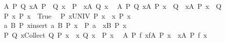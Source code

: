 \begin{isabellebody}
\ \ {\isachardoublequoteopen}{\isasymAnd}A\ P\ Q{\isachardot}{\kern0pt}\ {\isacharparenleft}{\kern0pt}{\isasymforall}x{\isasymin}A{\isachardot}{\kern0pt}\ P\ {\isasymlongrightarrow}\ Q\ x{\isacharparenright}{\kern0pt}\ {\isasymlongleftrightarrow}\ {\isacharparenleft}{\kern0pt}P\ {\isasymlongrightarrow}\ {\isacharparenleft}{\kern0pt}{\isasymforall}x{\isasymin}A{\isachardot}{\kern0pt}\ Q\ x{\isacharparenright}{\kern0pt}{\isacharparenright}{\kern0pt}{\isachardoublequoteclose}\isanewline
\ \ {\isachardoublequoteopen}{\isasymAnd}A\ P\ Q{\isachardot}{\kern0pt}\ {\isacharparenleft}{\kern0pt}{\isasymforall}x{\isasymin}A{\isachardot}{\kern0pt}\ P\ x\ {\isasymlongrightarrow}\ Q{\isacharparenright}{\kern0pt}\ {\isasymlongleftrightarrow}\ {\isacharparenleft}{\kern0pt}{\isacharparenleft}{\kern0pt}{\isasymexists}x{\isasymin}A{\isachardot}{\kern0pt}\ P\ x{\isacharparenright}{\kern0pt}\ {\isasymlongrightarrow}\ Q{\isacharparenright}{\kern0pt}{\isachardoublequoteclose}\isanewline
\ \ {\isachardoublequoteopen}{\isasymAnd}P{\isachardot}{\kern0pt}\ {\isacharparenleft}{\kern0pt}{\isasymforall}x{\isasymin}{\isacharbraceleft}{\kern0pt}{\isacharbraceright}{\kern0pt}{\isachardot}{\kern0pt}\ P\ x{\isacharparenright}{\kern0pt}\ {\isasymlongleftrightarrow}\ True{\isachardoublequoteclose}\isanewline
\ \ {\isachardoublequoteopen}{\isasymAnd}P{\isachardot}{\kern0pt}\ {\isacharparenleft}{\kern0pt}{\isasymforall}x{\isasymin}UNIV{\isachardot}{\kern0pt}\ P\ x{\isacharparenright}{\kern0pt}\ {\isasymlongleftrightarrow}\ {\isacharparenleft}{\kern0pt}{\isasymforall}x{\isachardot}{\kern0pt}\ P\ x{\isacharparenright}{\kern0pt}{\isachardoublequoteclose}\isanewline
\ \ {\isachardoublequoteopen}{\isasymAnd}a\ B\ P{\isachardot}{\kern0pt}\ {\isacharparenleft}{\kern0pt}{\isasymforall}x{\isasymin}insert\ a\ B{\isachardot}{\kern0pt}\ P\ x{\isacharparenright}{\kern0pt}\ {\isasymlongleftrightarrow}\ {\isacharparenleft}{\kern0pt}P\ a\ {\isasymand}\ {\isacharparenleft}{\kern0pt}{\isasymforall}x{\isasymin}B{\isachardot}{\kern0pt}\ P\ x{\isacharparenright}{\kern0pt}{\isacharparenright}{\kern0pt}{\isachardoublequoteclose}\isanewline
\ \ {\isachardoublequoteopen}{\isasymAnd}P\ Q{\isachardot}{\kern0pt}\ {\isacharparenleft}{\kern0pt}{\isasymforall}x{\isasymin}Collect\ Q{\isachardot}{\kern0pt}\ P\ x{\isacharparenright}{\kern0pt}\ {\isasymlongleftrightarrow}\ {\isacharparenleft}{\kern0pt}{\isasymforall}x{\isachardot}{\kern0pt}\ Q\ x\ {\isasymlongrightarrow}\ P\ x{\isacharparenright}{\kern0pt}{\isachardoublequoteclose}\isanewline
\ \ {\isachardoublequoteopen}{\isasymAnd}A\ P\ f{\isachardot}{\kern0pt}\ {\isacharparenleft}{\kern0pt}{\isasymforall}x{\isasymin}f{\isacharbackquote}{\kern0pt}A{\isachardot}{\kern0pt}\ P\ x{\isacharparenright}{\kern0pt}\ {\isasymlongleftrightarrow}\ {\isacharparenleft}{\kern0pt}{\isasymforall}x{\isasymin}A{\isachardot}{\kern0pt}\ P\ {\isacharparenleft}{\kern0pt}f\ x{\isacharparenright}{\kern0pt}{\isacharparenright}{\kern0pt}{\isachardoublequoteclose}\isanewline

\end{isabellebody}
